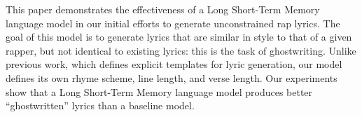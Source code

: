 This paper demonstrates the effectiveness of a Long Short-Term Memory language model in our initial efforts to generate unconstrained rap lyrics. The goal of this model is to generate lyrics that are similar in style to that of a given rapper, but not identical to existing lyrics: this is the task of ghostwriting. Unlike previous work, which defines explicit templates for lyric generation, our model defines its own rhyme scheme, line length, and verse length. Our experiments show that a Long Short-Term Memory language model produces better ``ghostwritten'' lyrics than a baseline model.
